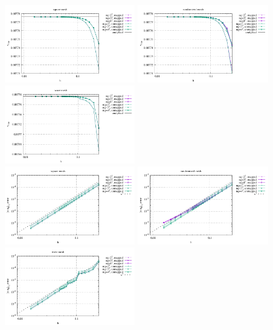 \begin{center}
\includegraphics[width=5.7cm]{python_codes/fieldstone_76/results/bench1/reg/vrms}
\includegraphics[width=5.7cm]{python_codes/fieldstone_76/results/bench1/rand/vrms}
\includegraphics[width=5.7cm]{python_codes/fieldstone_76/results/bench1/wave/vrms}\\
\includegraphics[width=5.7cm]{python_codes/fieldstone_76/results/bench1/reg/errors_V}
\includegraphics[width=5.7cm]{python_codes/fieldstone_76/results/bench1/rand/errors_V}
\includegraphics[width=5.7cm]{python_codes/fieldstone_76/results/bench1/wave/errors_V}\\

\end{center}
